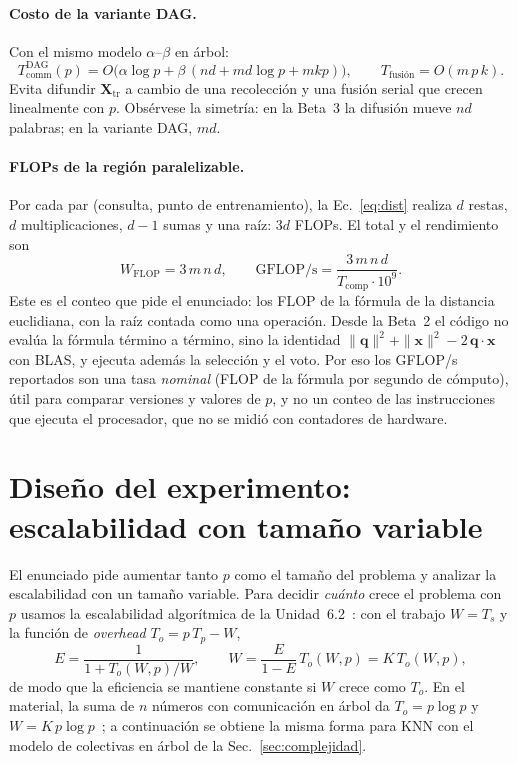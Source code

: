\documentclass[11pt,a4paper]{article}
\newcommand{\ntr}{n}   %
\newcommand{\mte}{m}   %
\newcommand{\Xtr}{\mathbf{X}_{\text{tr}}}
\newcommand{\Tcomp}{T_{\text{comp}}}
\newcommand{\Tcomm}{T_{\text{comm}}}
\begin{document}
\paragraph{Costo de la variante DAG.}
Con el mismo modelo $\alpha$--$\beta$ en árbol:
\begin{equation}
  \Tcomm^{\text{DAG}}(p)=O\big(\alpha\log p+\beta\,(\ntr d+\mte d\log p+\mte k p)\big),
  \qquad T_{\text{fusión}}=O(\mte\,p\,k).\label{eq:tdag}
\end{equation}
Evita difundir $\Xtr$ a cambio de una recolección y una fusión serial que crecen linealmente con
$p$. Obsérvese la simetría: en la Beta~3 la difusión mueve $\ntr d$ palabras; en la variante DAG,
$\mte d$.

\paragraph{FLOPs de la región paralelizable.}
Por cada par (consulta, punto de entrenamiento), la Ec.~\eqref{eq:dist} realiza $d$ restas, $d$
multiplicaciones, $d-1$ sumas y una raíz: $3d$ FLOPs. El total y el rendimiento son
\begin{equation}
  W_{\text{FLOP}}=3\,\mte\,\ntr\,d,\qquad
  \text{GFLOP/s}=\frac{3\,\mte\,\ntr\,d}{\Tcomp\cdot10^{9}}.\label{eq:flops}
\end{equation}
Este es el conteo que pide el enunciado: los FLOP de la fórmula de la distancia euclidiana, con la
raíz contada como una operación. Desde la Beta~2 el código no evalúa la fórmula término a término,
sino la identidad $\|\mathbf{q}\|^2+\|\mathbf{x}\|^2-2\,\mathbf{q}\cdot\mathbf{x}$ con BLAS, y ejecuta
además la selección y el voto. Por eso los GFLOP/s reportados son una tasa \emph{nominal} (FLOP de la
fórmula por segundo de cómputo), útil para comparar versiones y valores de $p$, y no un conteo de
las instrucciones que ejecuta el procesador, que no se midió con contadores de hardware.

\section{Diseño del experimento: escalabilidad con tamaño variable}
\label{sec:proporcionalidad}
El enunciado pide aumentar tanto $p$ como el tamaño del problema y analizar la escalabilidad con
un tamaño variable. Para decidir \emph{cuánto} crece el problema con $p$ usamos la escalabilidad
algorítmica de la Unidad~6.2~\cite{fiestasU62}: con el trabajo $W=T_s$ y la función de
\emph{overhead} $T_o=p\,T_p-W$,
\begin{equation}
  E=\frac{1}{1+T_o(W,p)/W},\qquad W=\frac{E}{1-E}\,T_o(W,p)=K\,T_o(W,p),
  \label{eq:iso-curso}
\end{equation}
de modo que la eficiencia se mantiene constante si $W$ crece como $T_o$. En el material, la suma de
$n$ números con comunicación en árbol da $T_o=p\log p$ y $W=K\,p\log p$~\cite{fiestasU62}; a
continuación se obtiene la misma forma para KNN con el modelo de colectivas en árbol de la
Sec.~\ref{sec:complejidad}.
\end{document}
